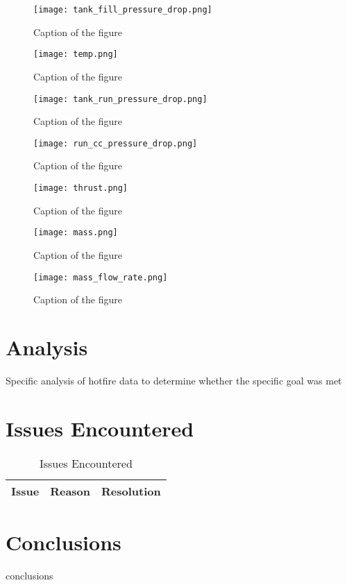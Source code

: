 \documentclass[letterpaper,12pt]{article}
\begin{document}
\begin{figure}[H]
    \centering
    \texttt{[image: tank\_fill\_pressure\_drop.png]}
    \caption{Caption of the figure}
    \label{fig:labelname}
\end{figure}

\begin{figure}[H]
    \centering
    \texttt{[image: temp.png]}
    \caption{Caption of the figure}
    \label{fig:labelname}
\end{figure}

\begin{figure}[H]
    \centering
    \texttt{[image: tank\_run\_pressure\_drop.png]}
    \caption{Caption of the figure}
    \label{fig:labelname}
\end{figure}

\begin{figure}[H]
    \centering
    \texttt{[image: run\_cc\_pressure\_drop.png]}
    \caption{Caption of the figure}
    \label{fig:labelname}
\end{figure}

\begin{figure}[H]
    \centering
    \texttt{[image: thrust.png]}
    \caption{Caption of the figure}
    \label{fig:labelname}
\end{figure}

\begin{figure}[H]
    \centering
    \texttt{[image: mass.png]}
    \caption{Caption of the figure}
    \label{fig:labelname}
\end{figure}

\begin{figure}[H]
    \centering
    \texttt{[image: mass\_flow\_rate.png]}
    \caption{Caption of the figure}
    \label{fig:labelname}
\end{figure}

\section{Analysis}
Specific analysis of hotfire data to determine whether the specific goal was met

\section{Issues Encountered}
\begin{table}[H]
\begin{center}
\caption{Issues Encountered}
\label{tbl:issues}
\begin{tabular}{|c|c|c|}
\hline
\textbf{Issue} & \textbf{Reason} & \textbf{Resolution} \\
\hline

\hline
\end{tabular}
\end{center}
\end{table}

\section{Conclusions}
{{ conclusions }}
\end{document}
